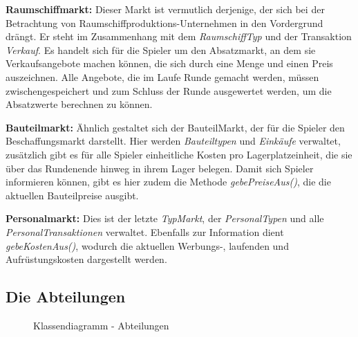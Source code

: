 \begin{seList}
\item \textbf{Raumschiffmarkt:} Dieser Markt ist vermutlich derjenige, der sich bei der Betrachtung von Raumschiffproduktions-Unternehmen in den Vordergrund drängt. Er steht im Zusammenhang mit dem \textit{RaumschiffTyp} und der Transaktion \textit{Verkauf}. Es handelt sich für die Spieler um den Absatzmarkt, an dem sie Verkaufsangebote machen können, die sich durch eine Menge und einen Preis auszeichnen. Alle Angebote, die im Laufe Runde gemacht werden, müssen zwischengespeichert und zum Schluss der Runde ausgewertet werden, um die Absatzwerte berechnen zu können.
\item \textbf{Bauteilmarkt:} Ähnlich gestaltet sich der BauteilMarkt, der für die Spieler den Beschaffungsmarkt darstellt. Hier werden \textit{Bauteiltypen} und \textit{Einkäufe} verwaltet, zusätzlich gibt es für alle Spieler einheitliche Kosten pro Lagerplatzeinheit, die sie über das Rundenende hinweg in ihrem Lager belegen. Damit sich Spieler informieren können, gibt es hier zudem die Methode \textit{gebePreiseAus()}, die die aktuellen Bauteilpreise ausgibt.
\item \textbf{Personalmarkt:} Dies ist der letzte \textit{TypMarkt}, der \textit{PersonalTypen} und alle \textit{PersonalTransaktionen} verwaltet. Ebenfalls zur Information dient \textit{gebeKostenAus()}, wodurch die aktuellen Werbungs-, laufenden und Aufrüstungskosten dargestellt werden.
\end{seList}

\subsection{Die Abteilungen}
\begin{figure}[htb]
     \centering
     \caption{Klassendiagramm - Abteilungen}
     \label{img:fachkonzept-entwurf-abteilung}
\end{figure}

